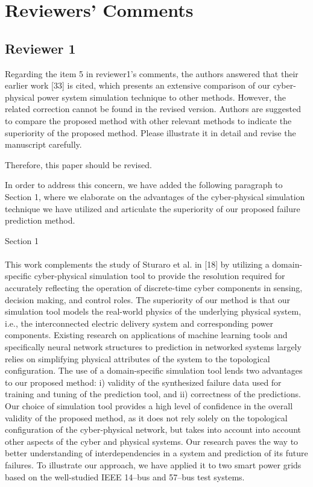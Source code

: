 \documentclass{article}
\newenvironment{response}{
  \doublespacing
  \setlength\parindent{0.05\linewidth}
  \ttfamily
}{}
\newenvironment{textblock}[1]
{\begin{tcolorbox}[breakable,enhanced]{#1 \\ \\}}
{\end{tcolorbox}}
\begin{document}
\section{Reviewers' Comments}
\label{sec:reviewers}

\subsection{Reviewer 1}
\label{sec:reviewer:r1}
Regarding the item 5 in reviewer1's comments, the authors answered that their earlier work [33] is cited, which presents an extensive comparison of our cyber-physical power system simulation technique to other methods. However, the related correction cannot be found in the revised version. Authors are suggested to compare the proposed method with other relevant methods to indicate the superiority of the proposed method. Please illustrate it in detail and revise the manuscript carefully.

Therefore, this paper should be revised.

\begin{response}
In order to address this concern, we have added the following paragraph to Section 1, where we elaborate on the advantages of the cyber-physical simulation technique we have utilized and articulate the  superiority of our proposed failure prediction method.

\begin{textblock}{Section 1}
This work complements the study of Sturaro et al. in [18] by utilizing a domain-specific cyber-physical simulation tool to provide the resolution required for accurately reflecting the operation of discrete-time cyber components in sensing, decision making, and control roles. The superiority of our method is that our simulation tool models the real-world physics of the underlying physical system, i.e., the interconnected electric delivery system and corresponding power components.  Existing research on applications of machine learning tools and specifically neural network structures to prediction in networked systems largely relies on simplifying physical attributes of the system to the topological configuration. The use of a domain-specific simulation tool lends two advantages to our proposed method: i) validity of the synthesized failure data used for training and tuning of the prediction tool, and ii) correctness of the predictions. Our choice of simulation tool provides a high level of confidence in the overall validity of the proposed method, as it does not rely solely on the topological configuration of the cyber-physical network, but takes into account into account other aspects of the cyber and physical systems. Our research paves the way to better understanding of interdependencies in a system and prediction of its future failures. To illustrate our approach, we have applied it to two smart power grids based on the well-studied IEEE 14--bus and 57--bus test systems.
\end{textblock}

\end{response}
\end{document}
